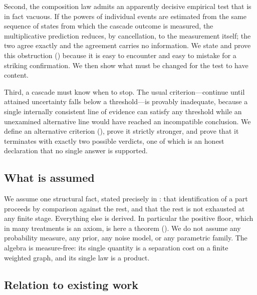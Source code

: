 \documentclass[11pt,a4paper]{article}
\theoremstyle{thmstyle}
\theoremstyle{definition}
\theoremstyle{remark}
\begin{document}
Second, the composition law admits an apparently decisive empirical test
that is in fact vacuous. If the powers of individual events are estimated
from the same sequence of states from which the cascade outcome is measured,
the multiplicative prediction reduces, by cancellation, to the measurement
itself; the two agree exactly and the agreement carries no information. We
state and prove this obstruction () because it is easy
to encounter and easy to mistake for a striking confirmation. We then show
what must be changed for the test to have content.

Third, a cascade must know when to stop. The usual criterion---continue
until attained uncertainty falls below a threshold---is provably inadequate,
because a single internally consistent line of evidence can satisfy any
threshold while an unexamined alternative line would have reached an
incompatible conclusion. We define an alternative criterion
(), prove it strictly stronger, and prove that it
terminates with exactly two possible verdicts, one of which is an honest
declaration that no single answer is supported.

\subsection{What is assumed}

We assume one structural fact, stated precisely in : that
identification of a part proceeds by comparison against the rest, and that
the rest is not exhausted at any finite stage. Everything else is derived.
In particular the positive floor, which in many treatments is an axiom, is
here a theorem (). We do not assume any probability
measure, any prior, any noise model, or any parametric family. The algebra
is measure-free: its single quantity is a separation cost on a finite
weighted graph, and its single law is a product.

\subsection{Relation to existing work}
\end{document}
